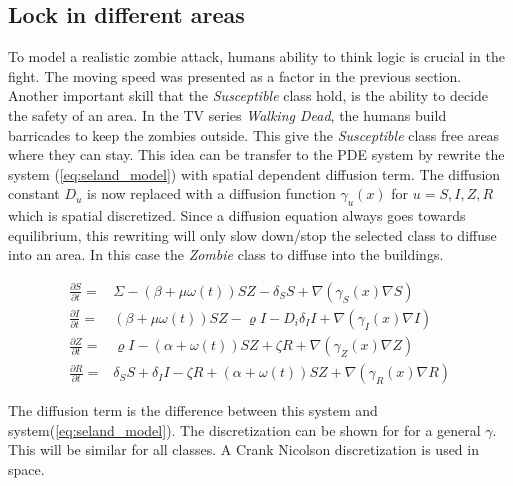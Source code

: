 \documentclass[%
twoside,                 %
final,                   %
10pt]{article}
\begin{document}
\subsection{Lock in different areas}
To model a realistic zombie attack, humans ability to think logic is crucial in the fight. The moving speed was presented as a factor in the previous section. Another important skill that the \emph{Susceptible} class hold, is the ability to decide the safety of an area. In the TV series \emph{Walking Dead}, the humans build barricades to keep the zombies outside. This give the \emph{Susceptible} class free areas where they can stay. This idea can be transfer to the PDE system by rewrite the system (\ref{eq:seland_model}) with spatial dependent diffusion term. The diffusion constant $D_u$ is now replaced with a diffusion function $\gamma_u(x)$ for $u= S,I,Z,R$ which is spatial discretized. Since a diffusion equation always goes towards equilibrium, this rewriting will only slow down/stop the selected class to diffuse into an area. In this case the \emph{Zombie} class to diffuse into the buildings. 

\begin{equation} \label{eq:seland_model_diff}
    \begin{aligned} 
    \frac{\partial S}{\partial t} =& \Sigma -(\beta+\mu \omega(t))SZ - \delta_SS +\nabla(\gamma_S(x) \nabla S) \\
    \frac{\partial I}{\partial t} =& (\beta+\mu \omega(t))SZ - \varrho I - D_i\delta_II+\nabla(\gamma_I(x) \nabla I)\\
    \frac{\partial Z}{\partial t} =& \varrho I- (\alpha+\omega(t))SZ + \zeta R+\nabla(\gamma_Z(x) \nabla Z)\\
    \frac{\partial R}{\partial t} =& \delta_SS +\delta_II -\zeta R + (\alpha+\omega(t))SZ+\nabla(\gamma_R(x) \nabla R) 
    \end{aligned}
\end{equation}

The diffusion term is the difference between this system and system(\ref{eq:seland_model}). The discretization can be shown for for a general $\gamma$. This will be similar for all classes. A Crank Nicolson discretization is used in space.
\end{document}
